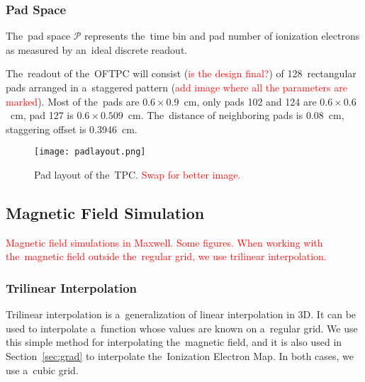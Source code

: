 			\subsubsection{Pad Space}
				The~pad space $\mathcal{P}$ represents the~time bin and pad number of ionization electrons as measured by an~ideal discrete readout.
			
				The~readout of the~\ac{OFTPC} will consist (\textcolor{red}{is the design final?}) of 128~rectangular pads arranged in a~staggered pattern (\textcolor{red}{add image where all the parameters are marked}). Most of the~pads are $0.6 \times 0.9$~cm, only pads 102 and 124 are $0.6 \times 0.6$~cm, pad 127 is $0.6 \times 0.509$~cm. The~distance of neighboring pads is 0.08~cm, staggering offset is 0.3946~cm.
	
				\begin{figure}
					\centering
					\texttt{[image: padlayout.png]}
					\caption{Pad layout of the~TPC. \textcolor{red}{Swap for better image.}}
					\label{fig:padlayout}
				\end{figure}
				
		\subsection{Magnetic Field Simulation}
		\textcolor{red}{Magnetic field simulations in Maxwell. Some figures. When working with the~magnetic field outside the~regular grid, we use trilinear interpolation.}
		
			\subsubsection{Trilinear Interpolation}
			\label{sec:trilin}
				Trilinear interpolation is a~generalization of linear interpolation in 3D. It can be used to interpolate a~function whose values are known on a~regular grid. We use this simple method for interpolating the~magnetic field, and it is also used in Section~\ref{sec:grad} to interpolate the~Ionization Electron Map. In both cases, we use a~cubic grid.
				
